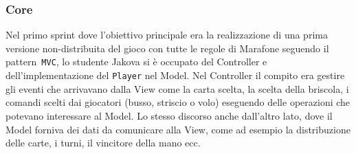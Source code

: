  \subsubsection{Core}\label{subsub:jakova:core}
    Nel primo sprint dove l’obiettivo principale era la realizzazione di una prima versione non-distribuita del gioco con tutte le regole di Marafone seguendo il pattern\texttt{ MVC}, lo studente Jakova si è occupato del Controller e dell’implementazione del \texttt{Player} nel Model. Nel Controller il compito era gestire gli eventi che arrivavano dalla View come la carta scelta, la scelta della briscola, i comandi scelti dai giocatori (busso, striscio o volo) eseguendo delle operazioni che potevano interessare al Model. Lo stesso discorso anche dall’altro lato, dove il Model forniva dei dati da comunicare alla View, come ad esempio la distribuzione delle carte, i turni, il vincitore della mano ecc.

